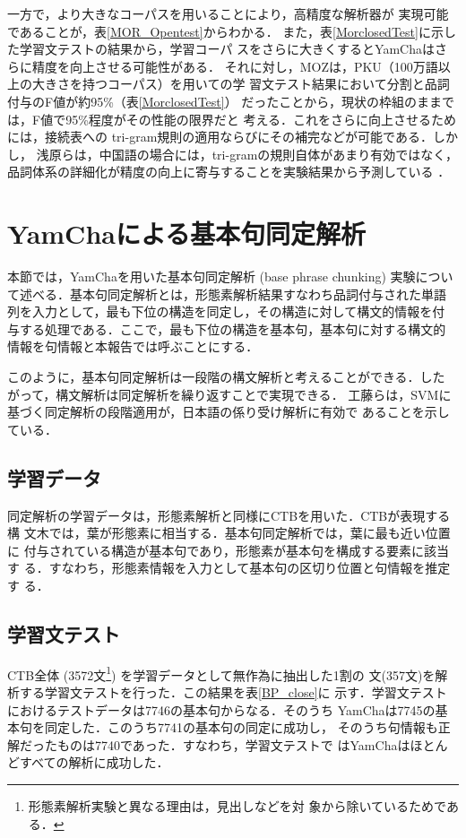 一方で，より大きなコーパスを用いることにより，高精度な解析器が
実現可能であることが，表\ref{MOR_Opentest}からわかる．
また，表\ref{MorclosedTest}に示した学習文テストの結果から，学習コーパ
スをさらに大きくするとYamChaはさらに精度を向上させる可能性がある．
それに対し，MOZは，PKU（100万語以上の大きさを持つコーパス）を用いての学
習文テスト結果において分割と品詞付与のF値が約95\%（表\ref{MorclosedTest}）
だったことから，現状の枠組のままでは，F値で95\%程度がその性能の限界だと
考える．これをさらに向上させるためには，接続表への
tri-gram規則の適用ならびにその補完などが可能である．しかし，
浅原らは，中国語の場合には，tri-gramの規則自体があまり有効ではなく，
品詞体系の詳細化が精度の向上に寄与することを実験結果から予測している
\cite{Asahara2002a}．


\section{YamChaによる基本句同定解析}
\label{節:基本句同定解析}

本節では，YamChaを用いた基本句同定解析 (base phrase chunking) 実験につい
て述べる．基本句同定解析とは，形態素解析結果すなわち品詞付与された単語
列を入力として，最も下位の構造を同定し，その構造に対して構文的情報を付
与する処理である．ここで，最も下位の構造を基本句，基本句に対する構文的
情報を句情報と本報告では呼ぶことにする．

このように，基本句同定解析は一段階の構文解析と考えることができる．した
がって，構文解析は同定解析を繰り返すことで実現できる\cite{Abney91}．
工藤らは，SVMに基づく同定解析の段階適用が，日本語の係り受け解析に有効で
あることを示している\cite{Kudo2002b}．

\subsection{学習データ}
同定解析の学習データは，形態素解析と同様にCTBを用いた．CTBが表現する構
文木では，葉が形態素に相当する．基本句同定解析では，葉に最も近い位置に
付与されている構造が基本句であり，形態素が基本句を構成する要素に該当す
る．すなわち，形態素情報を入力として基本句の区切り位置と句情報を推定す
る．

\subsection{学習文テスト}

CTB全体 (3572文\footnote{形態素解析実験と異なる理由は，見出しなどを対
象から除いているためである．}) を学習データとして無作為に抽出した1割の
文(357文)を解析する学習文テストを行った．この結果を表\ref{BP_close}に
示す．学習文テストにおけるテストデータは7746の基本句からなる．そのうち
YamChaは7745の基本句を同定した．このうち7741の基本句の同定に成功し，
そのうち句情報も正解だったものは7740であった．すなわち，学習文テストで
はYamChaはほとんどすべての解析に成功した．


